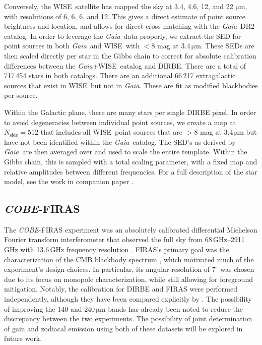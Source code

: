 \documentclass{aa}
\def\COBE{\textit{COBE}}
\def\GAIA{\textit{Gaia}}
\def\gaia{\textit{Gaia}}
\def\WISE{WISE}
\begin{document}
Conversely, the \WISE\ satellite \citep{wright:2010} has mapped the sky at 3.4, 4.6, 12, and 22 $\mathrm{\mu m}$, with resolutions of 6, 6, 6, and 12. This gives a direct estimate of point source brightness and location, and allows for direct cross-matching with the \GAIA\ DR2 catalog. In order to leverage the \gaia\ data properly, we extract the SED for point sources in both \gaia\ and \WISE\ with $<8$ mag at $3.4\,\mathrm{\mu m}$. These SEDs are then scaled directly per star in the Gibbs chain to correct for absolute calibration differences between the \gaia+\WISE\ catalog and DIRBE. There are a total of 717\,454 stars in both catalogs. There are an additional 66\,217 extragalactic sources that exist in \WISE\ but not in \gaia. These are fit as modified blackbodies per source.

Within the Galactic plane, there are many stars per single DIRBE pixel. In order to avoid degeneracies between individual point sources, we create a map at $N_\mathrm{side}=512$ that includes all \WISE\ point sources that are $>8$ mag at $3.4\,\mathrm{\mu m}$ but have not been identified within the \gaia\ catalog. The SED's as derived by \gaia\ are then averaged over and used to scale the entire template. Within the Gibbs chain, this is sampled with a total scaling parameter, with a fixed map and relative amplitudes between different frequencies. For a full description of the star model, see the work in companion paper \citet{CG02_04}.



\subsection{\COBE-FIRAS}

The \COBE-FIRAS experiment was an absolutely calibrated differential Michelson Fourier transform interferometer that observed the full sky from 68\,GHz--2911\,GHz with 13.6\,GHz frequency resolution \citep{fixsen:1994,mather:1999}. 
FIRAS's primary goal was the characterization of the CMB blackbody spectrum \citep{mather:1994}, which motivated much of the experiment's design choices. In particular, its angular resolution of $7^\circ$ was chosen due to its focus on monopole characterization, while still allowing for foreground mitigation. Notably, the calibration for DIRBE and FIRAS were performed independently, although they have been compared explicitly by \citet{fixsen1997}. The possibility of improving the $140$ and $240\,\mathrm{\mu m}$ bands has already been noted to reduce the discrepancy between the two experiments. The possibility of joint determination of gain and zodiacal emission using both of these datasets will be explored in future work.
\end{document}
